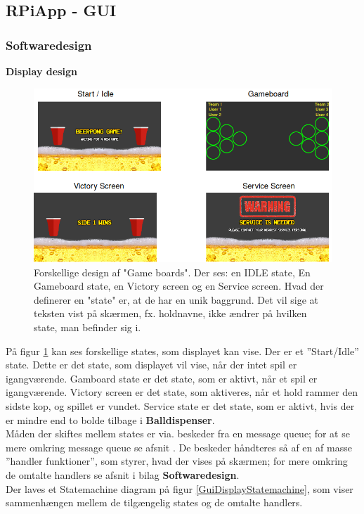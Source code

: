 \documentclass[Rapport/Rapport_main.tex]{subfiles}
\begin{document}
\subsection{RPiApp - GUI}
\subsubsection{Softwaredesign}
\textbf{Display design}
\begin{figure}[H]
    \centering
    \includegraphics[scale=0.5]{Softwaredesign/GUI/Pictures/Boards.png}
    \caption{Forskellige design af "Game boards". Der ses: en IDLE state,  En Gameboard state,  en Victory screen og en Service screen. Hvad der definerer en "state" er,  at  de har en unik baggrund. Det vil sige at teksten vist på skærmen, fx. holdnavne, ikke ændrer på hvilken state, man befinder sig i.  }
    \label{gameboards}
\end{figure}

På figur \ref{gameboards} kan ses forskellige states, som displayet kan vise.  Der er et ''Start/Idle'' state. Dette er det state, som displayet vil vise, når der intet spil er igangværende. Gamboard state er det state, som er aktivt, når et spil er igangværende. Victory screen er det state, som aktiveres, når et hold rammer den sidste kop, og spillet er vundet. Service state er det state, som er aktivt, hvis der er mindre end to bolde tilbage i \textbf{Balldispenser}. \\
Måden der skiftes mellem states er via. beskeder fra en message queue; for at se mere omkring message queue se afsnit . De beskeder håndteres så af en af masse ''handler funktioner'', som styrer, hvad der vises på skærmen; for mere omkring de omtalte handlers se afsnit  i bilag \textbf{Softwaredesign}.\\
Der laves et Statemachine diagram på figur \ref{GuiDisplayStatemachine}, som viser sammenhængen mellem de tilgængelig states og de omtalte handlers.
\end{document}
